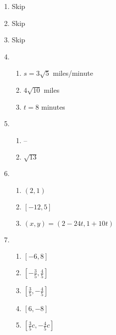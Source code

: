 \documentclass{article}
\begin{document}
\begin{enumerate}
\item Skip

\item Skip

\item Skip

\item

	\begin{enumerate}
	
	\item $s = 3\sqrt{5}$ miles/minute
	
	\item $4\sqrt{10}$ miles
	
	\item $t = 8$ minutes
	
	\end{enumerate}

\item

	\begin{enumerate}
	
	\item --
	
	\item $\sqrt{13}$
	
	\end{enumerate}

\item 

	\begin{enumerate}
	
	\item $(2, 1)$
	
	\item $[-12, 5]$
	
	\item $(x,y) = (2 - 24t, 1 + 10t)$
	
	\end{enumerate}

\item

	\begin{enumerate}
	
	\item $[-6, 8]$
	
	\item $[-\frac{3}{5}, \frac{4}{5}]$
	
	\item $[\frac{3}{5}, -\frac{4}{5}]$
	
	\item $[6, -8]$
	
	\item $[\frac{3}{5}c, -\frac{4}{5}c]$
	

\end{enumerate}
\end{enumerate}
\end{document}
